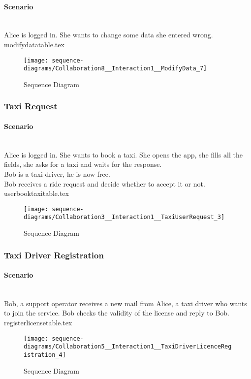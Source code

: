 \paragraph{Scenario} \hfill \\
Alice is logged in. She wants to change some data she entered wrong. 
{modifydatatable.tex}
\newpage
\vfill
\begin{figure}
\caption{Sequence Diagram}
\texttt{[image: sequence-diagrams/Collaboration8\_\_Interaction1\_\_ModifyData\_7]}
\centering
\end{figure}
\vfill
\clearpage

\subsubsection{Taxi Request} 
\label{ssub:taxirequest_scenario}
\paragraph{Scenario} \hfill \\
Alice is logged in. She wants to book a taxi. She opens the app, she fills all the fields, she asks for a taxi and waits for the response.\\
Bob is a taxi driver, he is now free.\\
Bob receives a ride request and decide whether to accept it or not.
{userbooktaxitable.tex}
\newpage
\vfill
\begin{figure}
\caption{Sequence Diagram}
\texttt{[image: sequence-diagrams/Collaboration3\_\_Interaction1\_\_TaxiUserRequest\_3]}
\centering
\end{figure}
\vfill
\clearpage

\subsubsection{Taxi Driver Registration} 
\label{ssub:taxidriverregisration_scenario}
\paragraph{Scenario} \hfill \\
Bob, a support operator receives a new mail from Alice, a taxi driver who wants to join the service. Bob checks the validity of the license and reply to Bob.
{registerlicensetable.tex}
\newpage
\vfill
\begin{figure}
\caption{Sequence Diagram}
\texttt{[image: sequence-diagrams/Collaboration5\_\_Interaction1\_\_TaxiDriverLicenceRegistration\_4]}
\centering
\end{figure}
\vfill
\clearpage

